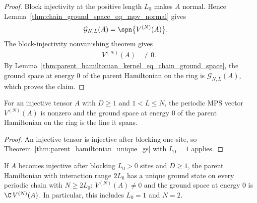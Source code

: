 \begin{proof}
    \leanok
    Block injectivity at the positive length $L_0$ makes $A$ normal. Hence
    Lemma~\ref{thm:chain_ground_space_eq_mpv_normal} gives
    \begin{align}
        \mathcal G_{N,L}(A)
         & =\spn\bigl\{V^{(N)}(A)\bigr\}.
    \end{align}
    The block-injectivity nonvanishing theorem gives
    \begin{align}
        V^{(N)}(A) & \neq0.
    \end{align}
    By Lemma~\ref{thm:parent_hamiltonian_kernel_eq_chain_ground_space}, the
    ground space at energy $0$ of the parent Hamiltonian on the ring is
    $\mathcal G_{N,L}(A)$, which proves the claim.
\end{proof}

\begin{lemma}%
    \label{thm:ground_space_unique_periodic}
    \leanok
    For an injective tensor $A$ with $D \ge 1$ and $1 < L \le N$, the
    periodic MPS vector $V^{(N)}(A)$ is nonzero and the ground space at
    energy $0$ of the parent Hamiltonian on the ring is the line it spans.
\end{lemma}

\begin{proof}
    \leanok
    An injective tensor is injective after blocking one site, so
    Theorem~\ref{thm:parent_hamiltonian_unique_gs} with $L_0=1$ applies.
\end{proof}

\begin{theorem}%
    \label{thm:unique_gs_injective}
    \leanok
    If $A$ becomes injective after blocking $L_0 > 0$ sites and $D \ge 1$,
    the parent Hamiltonian with interaction range $2L_0$ has a unique ground
    state on every periodic chain with $N \ge 2L_0$: $V^{(N)}(A)\ne0$ and
    the ground space at energy $0$ is $\C\,V^{(N)}(A)$. In particular, this
    includes $L_0=1$ and $N=2$.
\end{theorem}

